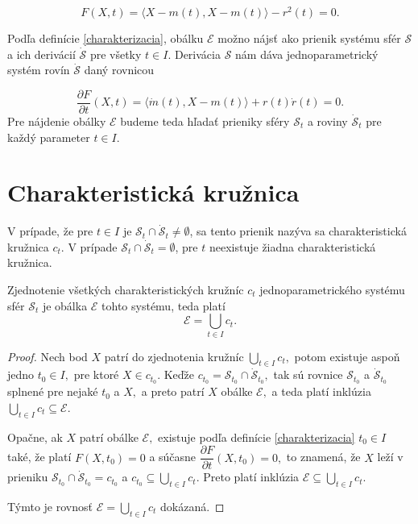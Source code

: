 $$
F(X, t) = \langle X - m(t), X - m(t) \rangle - r^2(t)= 0.
$$

Podľa definície \ref{charakterizacia}, obálku $\mathcal{E}$ možno nájsť ako prienik systému sfér $\mathcal{S}$ a ich derivácií $\mathcal{\dot{S}}$ pre všetky $t \in I$. Derivácia $\mathcal{S}$ nám dáva jednoparametrický systém rovín $\mathcal{\dot{S}}$ daný rovnicou

$$
\dfrac{\partial F}{\partial t} (X, t) = \langle \dot{m}(t), X - m(t) \rangle + r(t) \dot{r}(t) = 0.
$$
Pre nájdenie obálky $\mathcal{E}$ budeme teda hľadať prieniky sféry $\mathcal{S}_t$ a roviny $\mathcal{\dot{S}}_t $ pre každý parameter $t \in I$.

\section{Charakteristická kružnica}
\begin{definition}
V prípade, že pre $t \in I$ je $\mathcal{S}_{t} \cap \mathcal{\dot{S}}_{t} \neq \emptyset$, sa tento prienik nazýva sa charakteristická kružnica $c_{t}$. V prípade $\mathcal{S}_{t} \cap \mathcal{\dot{S}}_{t} = \emptyset$, pre \(t\) neexistuje žiadna charakteristická kružnica.
\end{definition}

\begin{lemma} \label{lema o zjednoteni charakteristickych kruznic}
Zjednotenie všetkých charakteristických kružníc $c_{t}$ jednoparametrického systému sfér $\mathcal{S}_t$ je obálka $\mathcal{E}$ tohto systému, teda platí $$\mathcal{E} = \bigcup_{t \in I} c_{t}.$$
\end{lemma}

\begin{proof}
Nech bod $X$ patrí do zjednotenia kružníc $ \bigcup_{t \in I} c_{t}, $ potom existuje aspoň jedno $t_0 \in I, $ pre ktoré $X \in c_{t_0}.$ Keďže $c_{t_0} = \mathcal{S}_{t_0} \cap \mathcal{\dot{S}}_{t_0}, $ tak sú rovnice $\mathcal{S}_{t_0} $ a $ \mathcal{\dot{S}}_{t_0}$ splnené pre nejaké $t_0$ a $X,$ a preto patrí $X$ obálke $\mathcal{E}, $ a teda platí inklúzia $\bigcup_{t \in I} c_{t} \subseteq \mathcal{E}. $

Opačne, ak $X$ patrí obálke $\mathcal{E},$ existuje podľa definície \ref{charakterizacia} $t_0 \in I $ také, že platí $F(X,t_0) = 0$ a súčasne $\dfrac{\partial F}{\partial t}(X, t_0)=0,$ to znamená, že $X$ leží v prieniku $\mathcal{S}_{t_0} \cap \mathcal{\dot{S}}_{t_0} = c_{t_0} $ a $c_{t_0} \subseteq \bigcup_{t \in I} c_t. $ Preto platí inklúzia $\mathcal{E} \subseteq \bigcup_{t \in I} c_t.$ 

Týmto je rovnosť $\mathcal{E} = \bigcup_{t \in I} c_t$ dokázaná.
\end{proof}

